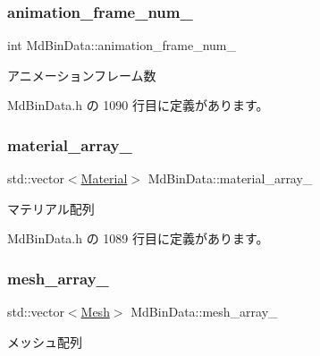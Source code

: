 \subsubsection{\texorpdfstring{animation\+\_\+frame\+\_\+num\+\_\+}{animation\_frame\_num\_}}
{\footnotesize\ttfamily int Md\+Bin\+Data\+::animation\+\_\+frame\+\_\+num\+\_\+\hspace{0.3cm}{\ttfamily [private]}}



アニメーションフレーム数 



 Md\+Bin\+Data.\+h の 1090 行目に定義があります。

\mbox{\label{class_md_bin_data_a2e418d4749d2154ca1c22cdb8ee99740}} 
\subsubsection{\texorpdfstring{material\+\_\+array\+\_\+}{material\_array\_}}
{\footnotesize\ttfamily std\+::vector$<$\mbox{\hyperlink{class_md_bin_data_1_1_material}{Material}}$>$ Md\+Bin\+Data\+::material\+\_\+array\+\_\+\hspace{0.3cm}{\ttfamily [private]}}



マテリアル配列 



 Md\+Bin\+Data.\+h の 1089 行目に定義があります。

\mbox{\label{class_md_bin_data_aefce3cdcd6dcdf388c936ade62c6b9fa}} 
\subsubsection{\texorpdfstring{mesh\+\_\+array\+\_\+}{mesh\_array\_}}
{\footnotesize\ttfamily std\+::vector$<$\mbox{\hyperlink{class_md_bin_data_1_1_mesh}{Mesh}}$>$ Md\+Bin\+Data\+::mesh\+\_\+array\+\_\+\hspace{0.3cm}{\ttfamily [private]}}



メッシュ配列 



